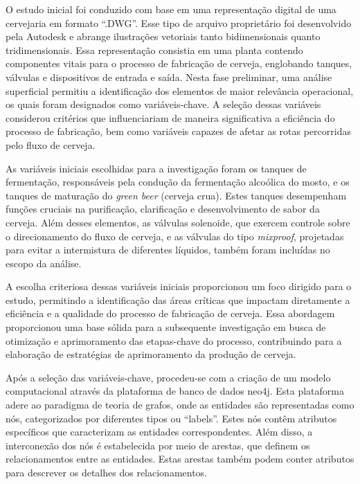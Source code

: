 O estudo inicial foi conduzido com base em uma representação digital de
uma cervejaria em formato ``.DWG''. Esse tipo de arquivo proprietário
foi desenvolvido pela Autodesk e abrange ilustrações vetoriais tanto
bidimensionais quanto tridimensionais. Essa representação consistia em
uma planta contendo componentes vitais para o processo de fabricação de
cerveja, englobando tanques, válvulas e dispositivos de entrada e saída.
Nesta fase preliminar, uma análise superficial permitiu a identificação
dos elementos de maior relevância operacional, os quais foram designados
como variáveis-chave. A seleção dessas variáveis considerou critérios
que influenciariam de maneira significativa a eficiência do processo de
fabricação, bem como variáveis capazes de afetar as rotas percorridas
pelo fluxo de cerveja.

As variáveis iniciais escolhidas para a investigação foram os tanques de
fermentação, responsáveis pela condução da fermentação alcoólica do
mosto, e os tanques de maturação do \emph{green beer} (cerveja crua).
Estes tanques desempenham funções cruciais na purificação, clarificação
e desenvolvimento de sabor da cerveja. Além desses elementos, as
válvulas solenoide, que exercem controle sobre o direcionamento do fluxo
de cerveja, e as válvulas do tipo \emph{mixproof}, projetadas para
evitar a intermistura de diferentes líquidos, também foram incluídas no
escopo da análise.

A escolha criteriosa dessas variáveis iniciais proporcionou um foco
dirigido para o estudo, permitindo a identificação das áreas críticas
que impactam diretamente a eficiência e a qualidade do processo de
fabricação de cerveja. Essa abordagem proporcionou uma base sólida para
a subsequente investigação em busca de otimização e aprimoramento das
etapas-chave do processo, contribuindo para a elaboração de estratégias
de aprimoramento da produção de cerveja.

Após a seleção das variáveis-chave, procedeu-se com a criação de um
modelo computacional através da plataforma de banco de dados
neo4j\texttrademark. Esta plataforma adere ao paradigma de teoria de
grafos, onde as entidades são representadas como nós, categorizados por
diferentes tipos ou ``labels''. Estes nós contêm atributos específicos
que caracterizam as entidades correspondentes. Além disso, a
interconexão dos nós é estabelecida por meio de arestas, que definem os
relacionamentos entre as entidades. Estas arestas também podem conter
atributos para descrever os detalhes dos relacionamentos.

